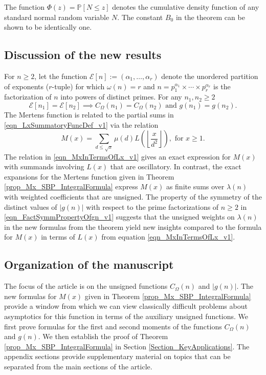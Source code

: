 \documentclass[11pt,reqno,a4letter]{article}
\newcommand{\hlocalref}[1]{\hyperref[#1]{\ref{#1}}}
\numberwithin{equation}{section}
\numberwithin{figure}{section}
\numberwithin{table}{section}
\newcommand{\Floor}[2]{\ensuremath{\left\lfloor \frac{#1}{#2} \right\rfloor}}
\theoremstyle{plain}
\numberwithin{theorem}{section}
\theoremstyle{definition}
\begin{document}
The function $\Phi(z) = \mathbb{P}[N \leq z]$ denotes the cumulative density function of 
any standard normal random variable $N$. 
The constant $B_0$ in the theorem can be shown to be identically one. 

\subsection{Discussion of the new results}

For $n \geq 2$, let the function 
$\mathcal{E}[n] := (\alpha_1, \ldots, \alpha_r)$ denote the unordered 
partition of exponents ($r$-tuple) for which $\omega(n) = r$ and 
$n = p_1^{\alpha_1} \times \cdots \times p_r^{\alpha_r}$ is the factorization of 
$n$ into powers of distinct primes. 
For any $n_1,n_2 \geq 2$ 
\begin{equation}
\label{eqn_FactSymmPropertyOfgn_v1} 
\mathcal{E}[n_1] = \mathcal{E}[n_2] \implies C_{\Omega}(n_1) = C_{\Omega}(n_2) \text{ and } 
	g(n_1) = g(n_2). 
\end{equation}
The Mertens function is related to the partial sums in 
\eqref{eqn_LxSummatoryFuncDef_v1} 
via the relation \cite{HUMPHRIES-JNT-2013,LEHMAN-1960} 
\begin{equation}
\label{eqn_MxInTermsOfLx_v1} 
M(x) = \sum_{d \leq \sqrt{x}} \mu(d) L\left(\Floor{x}{d^2}\right), \text{ for } x \geq 1.
\end{equation}
The relation in \eqref{eqn_MxInTermsOfLx_v1} 
gives an exact expression for $M(x)$ with summands involving $L(x)$ that are oscillatory. 
In contrast, the exact expansions for the Mertens function given in 
Theorem \hlocalref{prop_Mx_SBP_IntegralFormula} 
express $M(x)$ as finite sums over $\lambda(n)$ with weighted coefficients that are unsigned. 
The property of the symmetry of the distinct values of $|g(n)|$ with respect to the 
prime factorizations of $n \geq 2$ in \eqref{eqn_FactSymmPropertyOfgn_v1} 
suggests that the unsigned weights on $\lambda(n)$ in 
the new formulas from the theorem yield new insights compared to the 
formula for $M(x)$ in terms of $L(x)$ from equation \eqref{eqn_MxInTermsOfLx_v1}.

\subsection{Organization of the manuscript}

The focus of the article is on the unsigned functions 
$C_{\Omega}(n)$ and $|g(n)|$. 
The new formulas for $M(x)$ given in 
Theorem \hlocalref{prop_Mx_SBP_IntegralFormula} 
provide a window from which we can view classically  
difficult problems about asymptotics for this function in terms of the 
auxiliary unsigned functions. 
We first prove formulas for the first and second moments of the functions 
$C_{\Omega}(n)$ and $g(n)$. We then establish the proof of 
Theorem \hlocalref{prop_Mx_SBP_IntegralFormula} in 
Section \hlocalref{Section_KeyApplications}. 
The appendix sections provide 
supplementary material on topics that can be separated from the 
main sections of the article. 
\end{document}
